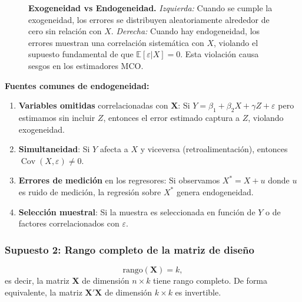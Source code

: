 \documentclass[11pt,a4paper]{article}
\DeclareMathOperator{\Cov}{Cov}
\begin{document}
\begin{figure}[H]
\caption{\textbf{Exogeneidad vs Endogeneidad.} \emph{Izquierda:} Cuando se cumple la exogeneidad, los errores se distribuyen aleatoriamente alrededor de cero sin relación con \(X\). \emph{Derecha:} Cuando hay endogeneidad, los errores muestran una correlación sistemática con \(X\), violando el supuesto fundamental de que \(\mathbb{E}[\varepsilon|X]=0\). Esta violación causa sesgos en los estimadores MCO.}
\label{fig:exogeneidad_endogeneidad}
\end{figure}

\noindent\textbf{Fuentes comunes de endogeneidad:}

\begin{enumerate}
\item \textbf{Variables omitidas} correlacionadas con \(\mathbf{X}\): Si \(Y = \beta_1 + \beta_2 X + \gamma Z + \varepsilon\) pero estimamos sin incluir \(Z\), entonces el error estimado captura a \(Z\), violando exogeneidad.

\item \textbf{Simultaneidad}: Si \(Y\) afecta a \(X\) y viceversa (retroalimentación), entonces \(\Cov(X,\varepsilon) \neq 0\).

\item \textbf{Errores de medición} en los regresores: Si observamos \(X^* = X + u\) donde \(u\) es ruido de medición, la regresión sobre \(X^*\) genera endogeneidad.

\item \textbf{Selección muestral}: Si la muestra es seleccionada en función de \(Y\) o de factores correlacionados con \(\varepsilon\).
\end{enumerate}

\subsubsection{Supuesto 2: Rango completo de la matriz de diseño}

\begin{tcolorbox}[colback=white, colframe=green!60, colbacktitle=green!60, coltitle=white, title=Supuesto 2: Ausencia de Multicolinealidad Perfecta, fonttitle=\bfseries]
\[
\boxed{\text{rango}(\mathbf{X}) = k},
\]
es decir, la matriz \(\mathbf{X}\) de dimensión \(n \times k\) tiene rango completo. De forma equivalente, la matriz \(\mathbf{X}'\mathbf{X}\) de dimensión \(k \times k\) es invertible.
\end{tcolorbox}
\end{document}
